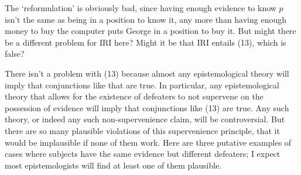 \noindent The `reformulation' is obviously bad, since having enough evidence to know $p$ isn't the same as being in a position to know it, any more than having enough money to buy the computer puts George in a position to buy it. But might there be a different problem for IRI here? Might it be that IRI entails (13), which is false?


\noindent There isn't a problem with (13) because almost any epistemological theory will imply that conjunctions like that are true. In particular, any epistemological theory that allows for the existence of defeaters to not supervene on the possession of evidence will imply that conjunctions like (13) are true. Any such theory, or indeed any such non-supervenience claim, will be controversial. But there are so many plausible violations of this supervenience principle, that it would be implausible if none of them work. Here are three putative examples of cases where subjects have the same evidence but different defeaters; I expect most epistemologists will find at least one of them plausible.

